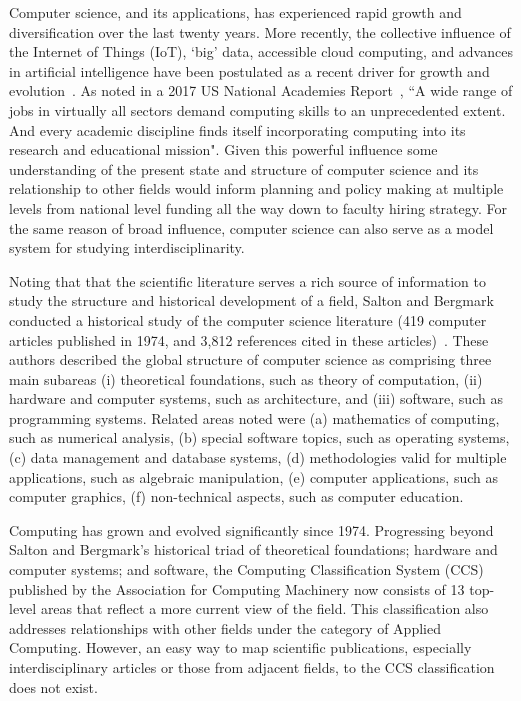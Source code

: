 Computer science, and its applications, has experienced rapid growth and diversification over the last twenty years. More recently, the collective influence of the Internet of Things (IoT), `big' data, accessible cloud computing, and advances in artificial intelligence have been postulated as a recent driver for growth and evolution~\cite{siebel2019_digital}. As noted in a 2017 US National Academies Report~\cite{nas_2017}, ``A wide range of jobs in virtually all sectors demand computing skills to an unprecedented extent. And every academic discipline finds itself incorporating computing into its research and educational mission". Given this powerful influence some understanding of the present state and structure of computer science and its relationship to other fields would inform planning and policy making at multiple levels from national level funding all the way down to faculty hiring strategy. For the same reason of broad influence, computer science can also serve as a model system for studying interdisciplinarity. 

Noting that that the scientific literature serves a rich source of information to study the structure and historical development of a field, Salton and Bergmark conducted a historical study  of the computer science literature (419 computer articles published in 1974,  and 3,812 references cited in these articles)~\cite{salton_citation_1979}. These authors described the global structure of computer science as comprising three main subareas (i) theoretical foundations, such as theory of computation, (ii) hardware and computer systems, such as architecture,  and (iii) software, such as programming systems.  Related areas noted were (a) mathematics of computing, such as numerical analysis, (b) special software topics, such as operating systems, (c) data management and database systems, (d) methodologies valid for multiple applications, such as algebraic manipulation, (e) computer applications, such as computer graphics, (f) non-technical aspects, such as computer education. 

Computing has grown and evolved significantly since 1974. Progressing beyond Salton and Bergmark's historical triad of theoretical foundations; hardware and computer systems; and software, the Computing Classification System (CCS)~\cite{acm_ref} published by the Association for Computing Machinery now consists of 13 top-level areas that reflect a more current view of the field. This classification also addresses relationships with other fields under the category of Applied Computing. However, an easy way to map scientific publications, especially interdisciplinary articles or those from adjacent fields, to the CCS classification does not exist. 

